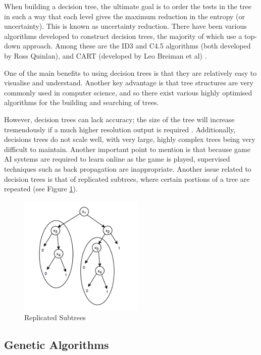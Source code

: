 \documentclass[a4paper,oneside]{report}
\begin{document}
When building a decision tree, the ultimate goal is to order the tests in the tree in such a way that each level gives the maximum reduction in the entropy (or uncertainty). This is known as uncertainty reduction. There have been various algorithms developed to construct decision trees, the majority of which use a top-down approach. Among these are the ID3 and C4.5 algorithms (both developed by Ross Quinlan), and CART (developed by Leo Breiman et al) \cite{Quinlan86inductionof,Quinlan:1993:CPM:152181,breiman1984classification}.

One of the main benefits to using decision trees is that they are relatively easy to visualise and understand. Another key advantage is that tree structures are very commonly used in computer science, and so there exist various highly optimised algorithms for the building and searching of trees.

However, decision trees can lack accuracy; the size of the tree will increase tremendously if a much higher resolution output is required \cite{schwab2004ai}. Additionally, decisions trees do not scale well, with very large, highly complex trees being very difficult to maintain. Another important point to mention is that because game AI systems are required to learn online as the game is played, supervised techniques such as back propagation are inappropriate. Another issue related to decision trees is that of replicated subtrees, where certain portions of a tree are repeated (see Figure \ref{fig:ReplicatedSubtrees}).

\begin{figure}[h!]
	\centering
		\includegraphics[width=60mm]{sources/images/ReplicatedSubtrees}
    	\caption{Replicated Subtrees}
    	\label{fig:ReplicatedSubtrees}
\end{figure}

\subsection{Genetic Algorithms}
\end{document}
